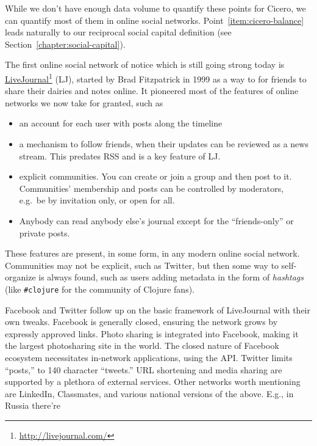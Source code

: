 \documentclass[10pt,oneside]{memoir}
\begin{document}
\begin{Spacing}{2}
While we don't have enough data volume to quantify these points for Cicero, we can quantify most of them in online social networks.  Point~\ref{item:cicero-balance} leads naturally to our reciprocal social capital definition (see Section~\ref{chapter:social-capital}).


The first online social network of notice which is still going strong today is \href{http://livejournal.com/}{LiveJournal}\footnote{\href{http://livejournal.com/}{http://livejournal.com/}} (LJ), started by Brad Fitzpatrick in 1999 as a way to for friends to share their dairies and notes online.  It pioneered most of the features of online networks we now take for granted, such as


\begin{itemize}


\item an account for each user with posts along the timeline

\item a mechanism to follow friends, when their updates can be reviewed as a news stream. This predates RSS and is a key feature of LJ.

\item explicit communities. You can create or join a group and then post to it. Communities' membership and posts can be controlled by moderators, e.g.\ be by invitation only, or open for all.

\item Anybody can read anybody else's journal except for the ``friends-only'' or private posts.
\end{itemize}

These features are present, in some form, in any modern online social network.  Communities may not be explicit, such as Twitter, but then some way to self-organize is always found, such as users adding metadata in the form of {\itshape hashtags} (like \texttt{\#clojure} for the community of Clojure fans).


Facebook and Twitter follow up on the basic framework of LiveJournal with their own tweaks. 
 Facebook is generally closed, ensuring the network grows by expressly approved links.  Photo sharing is integrated into Facebook, making it the largest photosharing site in the world.  The closed nature of Facebook ecosystem necessitates in-network applications, using the API.
Twitter limits ``posts,'' to 140 character ``tweets.''  URL shortening and media sharing are supported by a plethora of external services.
Other networks worth mentioning are LinkedIn, Classmates, and various national versions of the above.  E.g., in Russia there're



\end{Spacing}
\end{document}
